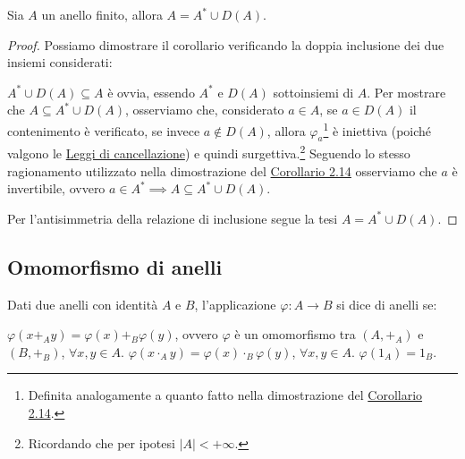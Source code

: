 \documentclass[11pt]{scrartcl}
\begin{document}
\begin{corollary}
\label{a:2.17}
Sia $A$ un anello finito, allora $A=A^* \cup D(A)$.
\end{corollary}

\begin{proof}
Possiamo dimostrare il corollario verificando la doppia inclusione dei due insiemi considerati:
	\begin{itemize}
	\ii $A^* \cup D(A) \subseteq A$ è ovvia, essendo $A^*$ e $D(A)$ sottoinsiemi di $A$.
	\ii Per mostrare che $A \subseteq A^* \cup D(A)$, osserviamo che, considerato $a \in A$, se $a \in D(A)$ il contenimento è verificato, se invece $a \not\in D(A)$, allora $\varphi_a$\footnote{Definita analogamente a quanto fatto nella dimostrazione del \hyperref[r:cor2]{Corollario 2.14}.} è iniettiva (poiché valgono le  \hyperref[r:prop]{Leggi di cancellazione}) e quindi surgettiva.\footnote{Ricordando che per ipotesi $|A|<+\infty$.} Seguendo lo stesso ragionamento utilizzato nella dimostrazione del \hyperref[r:cor2]{Corollario 2.14} osserviamo che $a$ è invertibile, ovvero $a \in A^* \implies A \subseteq A^* \cup D(A)$.
	\end{itemize}
Per l'antisimmetria della relazione di inclusione segue la tesi $A=A^* \cup D(A)$.
\end{proof}


















\newpage

\subsection{Omomorfismo di anelli}
\begin{definition}
Dati due anelli con identità $A$ e $B$, l'applicazione $\varphi: A \longrightarrow B$ si dice  di anelli se:
	\begin{itemize}
	\ii $\varphi(x +_A y) = \varphi(x) +_B \varphi(y)$, ovvero $\varphi$ è un omomorfismo tra $(A,+_A)$ e $(B,+_B)$, $\forall x,y \in A$.
	\ii $\varphi(x \cdot_A y) = \varphi(x) \cdot_B \varphi(y)$,  $\forall x,y \in A$.
	\ii $\varphi(1_A)=1_B$.
	\end{itemize}
\end{definition}
\end{document}
